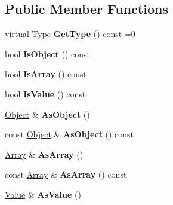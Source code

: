 \subsection*{Public Member Functions}
\begin{DoxyCompactItemize}
\item 
\hypertarget{class_jzon_1_1_node_a494c21ab7856809ceea4719d6962943d}{virtual Type {\bfseries Get\-Type} () const =0}\label{class_jzon_1_1_node_a494c21ab7856809ceea4719d6962943d}

\item 
\hypertarget{class_jzon_1_1_node_a33308f53c2472c9bc49b451de67f6662}{bool {\bfseries Is\-Object} () const }\label{class_jzon_1_1_node_a33308f53c2472c9bc49b451de67f6662}

\item 
\hypertarget{class_jzon_1_1_node_a3efffe8b557ae5680ff7c64e28f8bc50}{bool {\bfseries Is\-Array} () const }\label{class_jzon_1_1_node_a3efffe8b557ae5680ff7c64e28f8bc50}

\item 
\hypertarget{class_jzon_1_1_node_aa825f03f64d58d06719a911bf9d3d489}{bool {\bfseries Is\-Value} () const }\label{class_jzon_1_1_node_aa825f03f64d58d06719a911bf9d3d489}

\item 
\hypertarget{class_jzon_1_1_node_a895d77d0c78b3e48141c3396fe4ee785}{\hyperlink{class_jzon_1_1_object}{Object} \& {\bfseries As\-Object} ()}\label{class_jzon_1_1_node_a895d77d0c78b3e48141c3396fe4ee785}

\item 
\hypertarget{class_jzon_1_1_node_a9d76906fb054e44f52d715e4191456cb}{const \hyperlink{class_jzon_1_1_object}{Object} \& {\bfseries As\-Object} () const }\label{class_jzon_1_1_node_a9d76906fb054e44f52d715e4191456cb}

\item 
\hypertarget{class_jzon_1_1_node_a055940749d53ee80b356c495f1563e06}{\hyperlink{class_jzon_1_1_array}{Array} \& {\bfseries As\-Array} ()}\label{class_jzon_1_1_node_a055940749d53ee80b356c495f1563e06}

\item 
\hypertarget{class_jzon_1_1_node_aafdde53998e10b667b29e2580913a342}{const \hyperlink{class_jzon_1_1_array}{Array} \& {\bfseries As\-Array} () const }\label{class_jzon_1_1_node_aafdde53998e10b667b29e2580913a342}

\item 
\hypertarget{class_jzon_1_1_node_a3dcc474ab6e9667f08325c953c303e61}{\hyperlink{class_jzon_1_1_value}{Value} \& {\bfseries As\-Value} ()}\label{class_jzon_1_1_node_a3dcc474ab6e9667f08325c953c303e61}


\end{DoxyCompactItemize}
